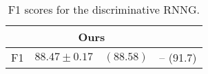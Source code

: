 \begin{table}[h]
\center
  \begin{tabular}{l|c|c}
        & Ours & \citet{dyer2016rnng}  \\ \hline
    F1  & $88.47 \pm	0.17 \quad (88.58)$ & -- \quad (91.7)
  \end{tabular}
  \caption{F1 scores for the discriminative RNNG.}
  \label{tab:disc-fscores}
\end{table}


